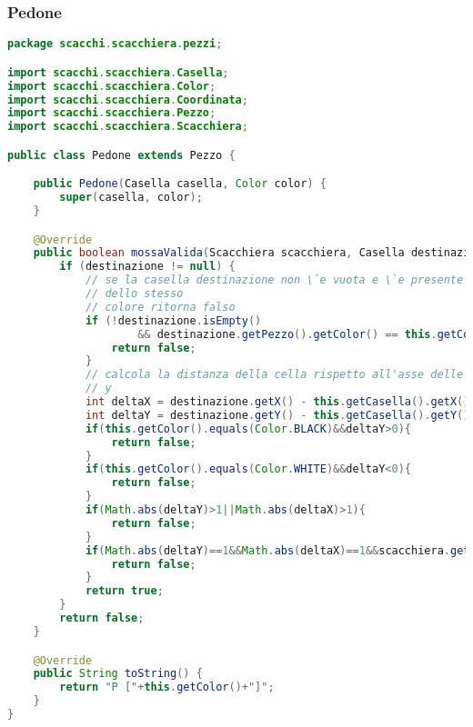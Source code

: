 \documentclass{article}
\begin{document}
\subsubsection{Pedone}
\begin{lstlisting}[language=Java,escapechar=|]
package scacchi.scacchiera.pezzi;

import scacchi.scacchiera.Casella;
import scacchi.scacchiera.Color;
import scacchi.scacchiera.Coordinata;
import scacchi.scacchiera.Pezzo;
import scacchi.scacchiera.Scacchiera;

public class Pedone extends Pezzo {

	public Pedone(Casella casella, Color color) {
		super(casella, color);
	}

	@Override
	public boolean mossaValida(Scacchiera scacchiera, Casella destinazione) {
		if (destinazione != null) {
			// se la casella destinazione non \`e vuota e \`e presente un Pezzo
			// dello stesso
			// colore ritorna falso
			if (!destinazione.isEmpty()
					&& destinazione.getPezzo().getColor() == this.getColor()) {
				return false;
			}
			// calcola la distanza della cella rispetto all'asse delle x e delle
			// y
			int deltaX = destinazione.getX() - this.getCasella().getX();
			int deltaY = destinazione.getY() - this.getCasella().getY();
			if(this.getColor().equals(Color.BLACK)&&deltaY>0){
				return false;
			}
			if(this.getColor().equals(Color.WHITE)&&deltaY<0){
				return false;
			}
			if(Math.abs(deltaY)>1||Math.abs(deltaX)>1){
				return false;
			}
			if(Math.abs(deltaY)==1&&Math.abs(deltaX)==1&&scacchiera.getCasella(new Coordinata(this.getCasella().getX()+deltaX, this.getCasella().getY()+deltaY)).isEmpty()){
				return false;
			}
			return true;
		}
		return false;
	}

	@Override
	public String toString() {
		return "P ["+this.getColor()+"]";
	}
}
\end{lstlisting}
\end{document}
